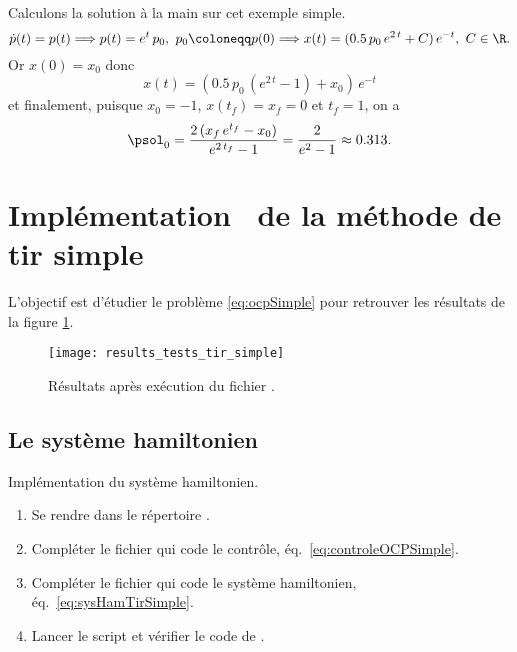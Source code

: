     Calculons la solution \`a la main sur cet exemple simple.
    \[
        \dot{p}(t) = p(t) \Longrightarrow p(t) = e^t \, p_0,~ p_0 \coloneqq p(0) \Longrightarrow x(t) = (0.5\, p_0 \,e^{2\,t} + C)\, e^{-t},~ C \in \R.
    \]
    Or $x(0) = x_0$ donc 
    \[
        x(t) = (0.5\, p_0 \, (e^{2\,t} - 1) + x_0 )\, e^{-t}
    \]
    et finalement, puisque $x_0 = -1$, $x(t_f) = x_f = 0$ et $t_f = 1$, on a
    \[
        \psol_0 = \frac{2 \, (x_f \, e^{t_f} - x_0)}{e^{2\,t_f}-1} = \frac{2}{e^{2}-1} \approx 0.313.
    \]

\section{Impl\'ementation \matlab\ de la m\'ethode de tir simple}

L'objectif est d'\'etudier le probl\`eme \eqref{eq:ocpSimple} pour retrouver les r\'esultats de la
figure \ref{fig:results_tests_tir_simple}.

\begin{figure}[ht!]
    \begin{center}
        \texttt{[image: results\_tests\_tir\_simple]}
    \end{center}
    \caption{R\'esultats apr\`es ex\'ecution du fichier .}
    \label{fig:results_tests_tir_simple}
\end{figure}

\subsection{Le syst\`eme hamiltonien}

\begin{myExercice} Impl\'ementation du syst\`eme hamiltonien.
\begin{enumerate}
    \item Se rendre dans le r\'epertoire .
    \item Compl\'eter le fichier  qui code le contr\^ole, \cf \'eq.~\eqref{eq:controleOCPSimple}.
    \item Compl\'eter le fichier  qui code le syst\`eme hamiltonien, \cf \'eq.~\eqref{eq:sysHamTirSimple}.
    \item Lancer le script  et v\'erifier le code de .
\end{enumerate}
\end{myExercice}

